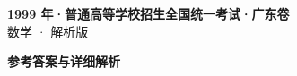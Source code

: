 \documentclass[zihao=-4, a4paper]{ctexart}
\begin{document}
\begin{center}
  {\Large\bfseries 1999 年·普通高等学校招生全国统一考试·广东卷}\\[4pt]
  {\large 数学 · 解析版}
\end{center}
\medskip
{}

\clearpage
{}
\begin{center}{\Large\bfseries 参考答案与详细解析}\end{center}
\medskip

\end{document}
